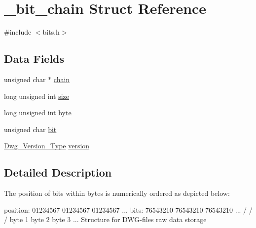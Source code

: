 \hypertarget{struct__bit__chain}{\section{\-\_\-bit\-\_\-chain \-Struct \-Reference}
\label{struct__bit__chain}
}


{\ttfamily \#include $<$bits.\-h$>$}

\subsection*{\-Data \-Fields}
\begin{DoxyCompactItemize}
\item 
unsigned char $\ast$ \hyperlink{struct__bit__chain_a7978cb53bea093be7176546d7fd6ffdf}{chain}
\item 
long unsigned int \hyperlink{struct__bit__chain_a3082df3e88e0e5a5649ad49598f83ca2}{size}
\item 
long unsigned int \hyperlink{struct__bit__chain_a33b30db9863ac6778619e406788393fa}{byte}
\item 
unsigned char \hyperlink{struct__bit__chain_ac5067ccd8cb8d9655b8cfb3d26704a8d}{bit}
\item 
\hyperlink{common_8h_aaf5c360464a2dd7c1d2c983debaacee7}{\-Dwg\-\_\-\-Version\-\_\-\-Type} \hyperlink{struct__bit__chain_aa5db3d09cb7fdf3627945acb5555e841}{version}
\end{DoxyCompactItemize}


\subsection{\-Detailed \-Description}
\-The position of bits within bytes is numerically ordered as depicted below\-:

position\-: 01234567 01234567 01234567 ... bits\-: 76543210 76543210 76543210 ... / / / byte 1 byte 2 byte 3 ... \-Structure for \-D\-W\-G-\/files raw data storage 

